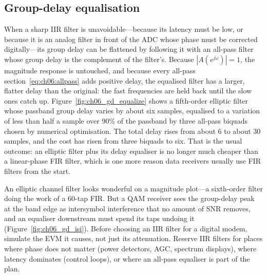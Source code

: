 \subsection{Group-delay equalisation}
\label{sec:ch06:gdeq}

When a sharp IIR filter is unavoidable---because its latency must be low, or because it is an
analog filter in front of the ADC whose phase must be corrected digitally---its group delay can be
flattened by following it with an all-pass filter whose group delay is the complement of the
filter's. Because $|A(e^{j\omega})|=1$, the magnitude response is untouched, and because every
all-pass section~\eqref{eq:ch06:allpass} adds positive delay, the equalised filter has a larger,
flatter delay than the original: the fast frequencies are held back until the slow ones catch up.
Figure~\ref{fig:ch06_gd_equalize} shows a fifth-order elliptic filter whose passband group delay
varies by about six samples, equalised to a variation of less than half a sample over 90\% of the
passband by three all-pass biquads chosen by numerical optimisation. The total delay rises from
about 6 to about 30 samples, and the cost has risen from three biquads to six. That is the usual
outcome: an elliptic filter plus its delay equaliser is no longer much cheaper than a linear-phase
FIR filter, which is one more reason data receivers usually use FIR filters from the start.


\begin{pitfall}
An elliptic channel filter looks wonderful on a magnitude plot---a sixth-order filter doing the work
of a 60-tap FIR. But a QAM receiver sees the group-delay peak at the band edge as intersymbol
interference that no amount of SNR removes, and an equaliser downstream must spend its taps undoing
it (Figure~\ref{fig:ch06_gd_isi}). Before choosing an IIR filter for a digital modem, simulate the
EVM it causes, not just its attenuation. Reserve IIR filters for places where phase does not matter
(power detectors, AGC, spectrum displays), where latency dominates (control loops), or where an
all-pass equaliser is part of the plan.
\end{pitfall}

